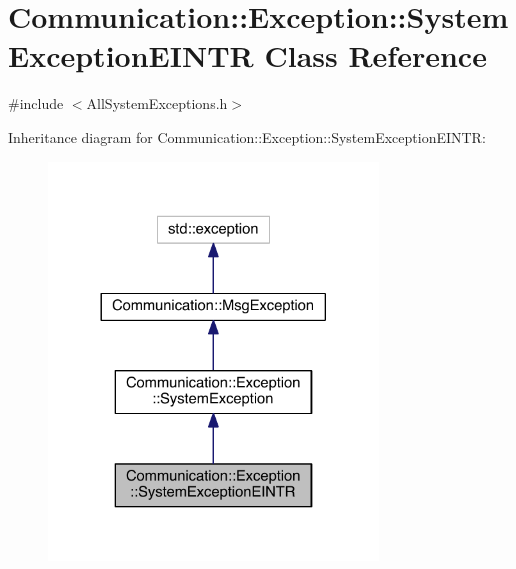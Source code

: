 \hypertarget{class_communication_1_1_exception_1_1_system_exception_e_i_n_t_r}{}\section{Communication\+:\+:Exception\+:\+:System\+Exception\+E\+I\+N\+T\+R Class Reference}
\label{class_communication_1_1_exception_1_1_system_exception_e_i_n_t_r}


{\ttfamily \#include $<$All\+System\+Exceptions.\+h$>$}



Inheritance diagram for Communication\+:\+:Exception\+:\+:System\+Exception\+E\+I\+N\+T\+R\+:\nopagebreak
\begin{figure}[H]
\begin{center}
\leavevmode
\includegraphics[width=248pt]{class_communication_1_1_exception_1_1_system_exception_e_i_n_t_r__inherit__graph}
\end{center}
\end{figure}


